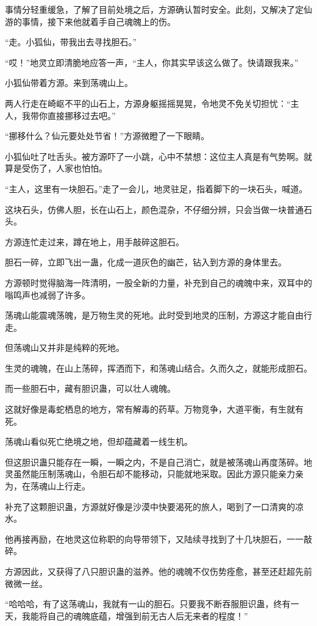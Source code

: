 \begin{this_body}
事情分轻重缓急，了解了目前处境之后，方源确认暂时安全。此刻，又解决了定仙游的事情，接下来他就着手自己魂魄上的伤。

“走。小狐仙，带我出去寻找胆石。”

“哎！”地灵立即清脆地应答一声，“主人，你其实早该这么做了。快请跟我来。”

小狐仙带着方源。来到荡魂山上。

两人行走在崎岖不平的山石上，方源身躯摇摇晃晃，令地灵不免关切担忧：“主人，我带你直接挪移过去吧。”

“挪移什么？仙元要处处节省！”方源微瞪了一下眼睛。

小狐仙吐了吐舌头。被方源吓了一小跳，心中不禁想：这位主人真是有气势啊。就算是受伤了，人家也怕怕。

“主人，这里有一块胆石。”走了一会儿，地灵驻足，指着脚下的一块石头，喊道。

这块石头，仿佛人胆，长在山石上，颜色混杂，不仔细分辨，只会当做一块普通石头。

方源连忙走过来，蹲在地上，用手敲碎这胆石。

胆石一碎，立即飞出一蛊，化成一道灰色的幽芒，钻入到方源的身体里去。

方源顿时觉得脑海一阵清明，一股全新的力量，补充到自己的魂魄中来，双耳中的嗡鸣声也减弱了许多。

荡魂山能震魂荡魄，是万物生灵的死地。此时受到地灵的压制，方源这才能自由行走。

但荡魂山又并非是纯粹的死地。

生灵的魂魄，在山上荡碎，挥洒而下，和荡魂山结合。久而久之，就能形成胆石。

而一些胆石中，藏有胆识蛊，可以壮人魂魄。

这就好像是毒蛇栖息的地方，常有解毒的药草。万物竞争，大道平衡，有生就有死。

荡魂山看似死亡绝境之地，但却蕴藏着一线生机。

但这胆识蛊只能存在一瞬，一瞬之内，不是自己消亡，就是被荡魂山再度荡碎。地灵虽然能压制荡魂山，令胆石却不能移动，只能就地采取。因此方源只能亲力亲为，在荡魂山上行走。

补充了这颗胆识蛊，方源就好像是沙漠中快要渴死的旅人，喝到了一口清爽的凉水。

他再接再励，在地灵这位称职的向导带领下，又陆续寻找到了十几块胆石，一一敲碎。

方源因此，又获得了八只胆识蛊的滋养。他的魂魄不仅伤势痊愈，甚至还赶超先前微微一丝。

“哈哈哈，有了这荡魂山，我就有一山的胆石。只要我不断吞服胆识蛊，终有一天，我能将自己的魂魄底蕴，增强到前无古人后无来者的程度！”


\end{this_body}

